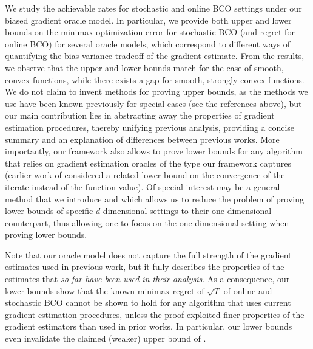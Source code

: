 We study the achievable rates for stochastic and online BCO settings under our biased gradient oracle model.  %
In particular, we provide both upper and lower bounds on the minimax optimization error for stochastic BCO (and regret for online BCO) for several oracle models, which correspond to different ways of quantifying the bias-variance tradeoff of the gradient estimate. From the results, we observe that the upper and lower bounds match for the case of smooth, convex functions, while there exists a gap for smooth, strongly convex functions. 
We do not claim to invent methods for proving upper bounds, as the methods we use have been known previously for special cases  (see the references above),
but our main contribution lies in abstracting away the properties of gradient estimation procedures, 
thereby unifying previous analysis, providing a concise summary and an explanation of differences between previous works.
More importantly, our framework also allows to prove lower bounds for any algorithm that relies on gradient
estimation oracles of the type our framework captures
(earlier work of \citealp{Chen88:LB-AoS} considered a related lower bound on the convergence of the iterate instead of the function value).
Of special interest may be a general method that we introduce and which allows us to reduce the problem of proving lower bounds of specific $d$-dimensional settings to their one-dimensional counterpart, thus allowing one to focus on the one-dimensional setting when proving lower bounds.

Note that our oracle model does not capture the full strength of the gradient estimates used in previous work, but it fully describes the properties of the estimates that \emph{so far have been used in their analysis}.
As a consequence, our lower bounds show that the known minimax regret of $\sqrt{T}$ \citep{BubeckDKP15,BuEl15,shamir2012complexity}
of online and stochastic BCO
cannot be shown to hold
for any algorithm that uses current gradient estimation procedures, unless the proof exploited finer properties
of the gradient estimators than used in prior works. In particular,
our lower bounds even invalidate the claimed (weaker) upper bound of \citet{DeElKo15}.

